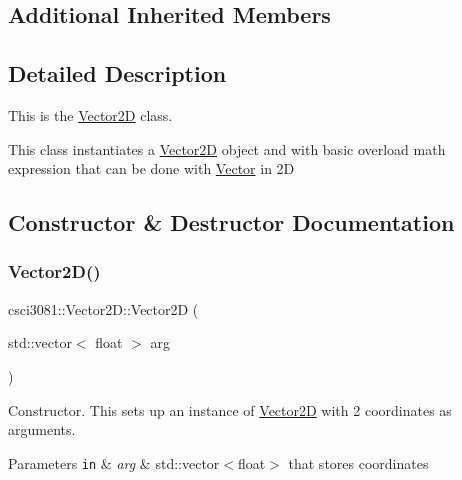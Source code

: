 \subsection*{Additional Inherited Members}


\subsection{Detailed Description}
This is the \hyperlink{classcsci3081_1_1Vector2D}{Vector2D} class. 

This class instantiates a \hyperlink{classcsci3081_1_1Vector2D}{Vector2D} object and with basic overload math expression that can be done with \hyperlink{classcsci3081_1_1Vector}{Vector} in 2D 

\subsection{Constructor \& Destructor Documentation}
\mbox{\label{classcsci3081_1_1Vector2D_a68e2f6906ba36747d914ef4923bee667}} 
\subsubsection{\texorpdfstring{Vector2\+D()}{Vector2D()}\hspace{0.1cm}{\footnotesize\ttfamily [1/3]}}
{\footnotesize\ttfamily csci3081\+::\+Vector2\+D\+::\+Vector2D (\begin{DoxyParamCaption}\item[{std\+::vector$<$ float $>$}]{arg }\end{DoxyParamCaption})}



Constructor. This sets up an instance of \hyperlink{classcsci3081_1_1Vector2D}{Vector2D} with 2 coordinates as arguments. 


\begin{DoxyParams}[1]{Parameters}
\mbox{\tt in}  & {\em arg} & std\+::vector$<$float$>$ that stores coordinates \\
\hline
\end{DoxyParams}
\mbox{\label{classcsci3081_1_1Vector2D_a39919ae0bc8a91377c20d26f9201e963}} 
